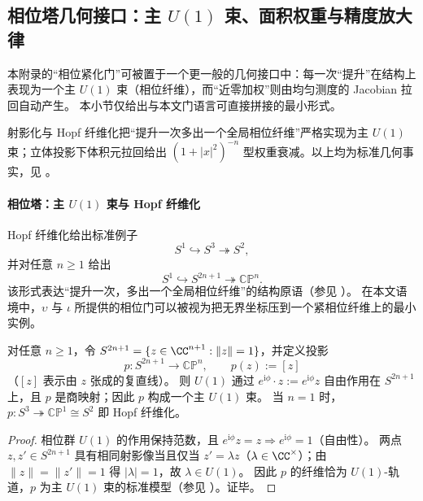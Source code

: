 \subsection{相位塔几何接口：主 \texorpdfstring{$U(1)$}{U(1)} 束、面积权重与精度放大律}\label{subsec:unit-disk-phase-tower}
本附录的“相位紧化门”可被置于一个更一般的几何接口中：每一次“提升”在结构上表现为一个主 \(U(1)\) 束（相位纤维），而“近零加权”则由均匀测度的 Jacobian 拉回自动产生。
本小节仅给出与本文门语言可直接拼接的最小形式。

\begin{remark}\label{rem:phase-tower-standard-chain}
射影化与 Hopf 纤维化把“提升一次多出一个全局相位纤维”严格实现为主 \(U(1)\) 束；立体投影下体积元拉回给出 \((1+|x|^{2})^{-n}\) 型权重衰减。以上均为标准几何事实，见 \cite{Husemoller1994FiberBundles}。
\end{remark}

\paragraph{相位塔：主 \texorpdfstring{$U(1)$}{U(1)} 束与 Hopf 纤维化}
Hopf 纤维化给出标准例子
\[
S^{1}\hookrightarrow S^{3}\twoheadrightarrow S^{2},
\]
并对任意 \(n\ge 1\) 给出
\[
S^{1}\hookrightarrow S^{2n+1}\twoheadrightarrow \mathbb{CP}^{n}.
\]
该形式表达“提升一次，多出一个全局相位纤维”的结构原语（参见 \cite{Husemoller1994FiberBundles}）。
在本文语境中，\(\upsilon\) 与 \(\iota\) 所提供的相位门可以被视为把无界坐标压到一个紧相位纤维上的最小实例。

\begin{proposition}\label{prop:phase-tower-principal-u1}
对任意 \(n\ge 1\)，令
\(
S^{2n+1}=\{z\in\CC^{n+1}:\|z\|=1\}
\)，并定义投影
\[
p:S^{2n+1}\to \mathbb{CP}^{n},\qquad p(z):=[z]
\]
（\([z]\) 表示由 \(z\) 张成的复直线）。
则 \(U(1)\) 通过 \(e^{\mathrm{i}\phi}\cdot z:=e^{\mathrm{i}\phi}z\) 自由作用在 \(S^{2n+1}\) 上，且 \(p\) 是商映射；因此 \(p\) 构成一个主 \(U(1)\) 束。
当 \(n=1\) 时，\(p:S^{3}\twoheadrightarrow\mathbb{CP}^{1}\cong S^{2}\) 即 Hopf 纤维化。
\end{proposition}
\begin{proof}
相位群 \(U(1)\) 的作用保持范数，且 \(e^{\mathrm{i}\phi}z=z\Rightarrow e^{\mathrm{i}\phi}=1\)（自由性）。
两点 \(z,z'\in S^{2n+1}\) 具有相同射影像当且仅当 \(z'=\lambda z\)（\(\lambda\in\CC^\times\)）；由 \(\|z\|=\|z'\|=1\) 得 \(|\lambda|=1\)，故 \(\lambda\in U(1)\)。
因此 \(p\) 的纤维恰为 \(U(1)\)-轨道，\(p\) 为主 \(U(1)\) 束的标准模型（参见 \cite{Husemoller1994FiberBundles}）。证毕。
\end{proof}


